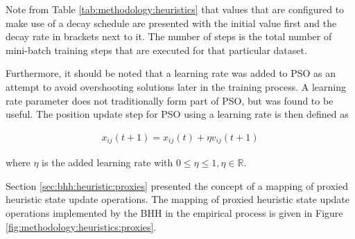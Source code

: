 Note from Table \ref{tab:methodology:heuristics} that values that are configured to make use of a decay schedule are presented with the initial value first and the decay rate in brackets next to it. The number of steps is the total number of mini-batch training steps that are executed for that particular dataset.

Furthermore, it should be noted that a learning rate was added to \acs{PSO} as an attempt to avoid overshooting solutions later in the training process. A learning rate parameter does not traditionally form part of \acs{PSO}, but was found to be useful. The position update step for \acs{PSO} using a learning rate is then defined as

\begin{equation}
      \label{eq:heuristics:pso:position_learning_rate}
      \begin{split}
            x_{ij}(t+1) = x_{ij}(t) + \eta v_{ij}(t+1)
      \end{split}
\end{equation}

where $\eta$ is the added learning rate with $0 \leq \eta \leq 1, \eta \in \mathbb{R}$.

Section \ref{sec:bhh:heuristic:proxies} presented the concept of a mapping of proxied heuristic state update operations. The mapping of proxied heuristic state update operations implemented by the \acs{BHH} in the empirical process is given in Figure \ref{fig:methodology:heuristics:proxies}.


